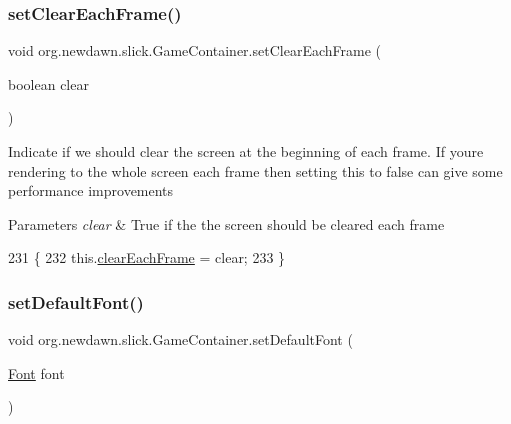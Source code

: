 \subsubsection{\texorpdfstring{set\+Clear\+Each\+Frame()}{setClearEachFrame()}}
{\footnotesize\ttfamily void org.\+newdawn.\+slick.\+Game\+Container.\+set\+Clear\+Each\+Frame (\begin{DoxyParamCaption}\item[{boolean}]{clear }\end{DoxyParamCaption})\hspace{0.3cm}{\ttfamily [inline]}}

Indicate if we should clear the screen at the beginning of each frame. If you\textquotesingle{}re rendering to the whole screen each frame then setting this to false can give some performance improvements


\begin{DoxyParams}{Parameters}
{\em clear} & True if the the screen should be cleared each frame \\
\hline
\end{DoxyParams}

\begin{DoxyCode}
231                                                  \{
232         this.\mbox{\hyperlink{classorg_1_1newdawn_1_1slick_1_1_game_container_acccadaba3a6d02a39d05b73fbe8d6135}{clearEachFrame}} = clear;
233     \}
\end{DoxyCode}
\mbox{\label{classorg_1_1newdawn_1_1slick_1_1_game_container_a95487dc9d4b9b57e879a30bd4f551f6f}} 
\subsubsection{\texorpdfstring{set\+Default\+Font()}{setDefaultFont()}}
{\footnotesize\ttfamily void org.\+newdawn.\+slick.\+Game\+Container.\+set\+Default\+Font (\begin{DoxyParamCaption}\item[{\mbox{\hyperlink{interfaceorg_1_1newdawn_1_1slick_1_1_font}{Font}}}]{font }\end{DoxyParamCaption})\hspace{0.3cm}{\ttfamily [inline]}}

